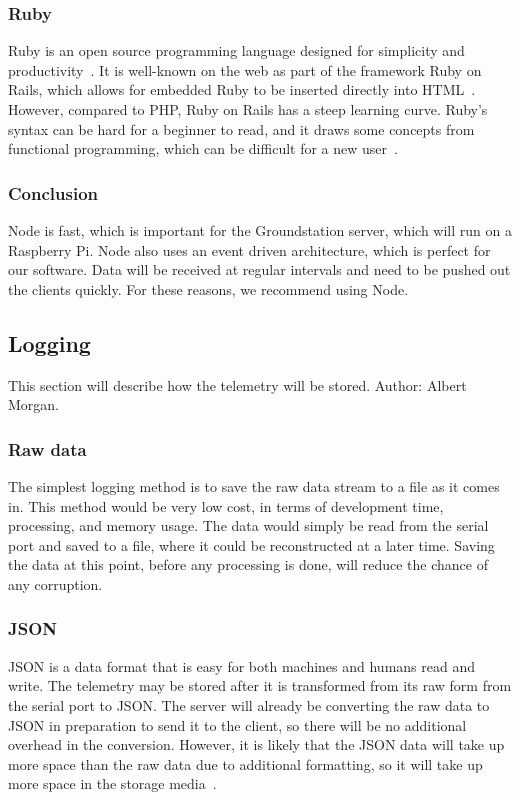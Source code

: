 \documentclass[10pt,draftclsnofoot,onecolumn]{IEEEtran}
\begin{document}
	\subsubsection{Ruby}
	Ruby is an open source programming language designed for simplicity and productivity~\cite{ruby}.
	It is well-known on the web as part of the framework Ruby on Rails, which allows for embedded Ruby to be inserted directly into HTML~\cite{getting-started-with-rails}.
	However, compared to PHP, Ruby on Rails has a steep learning curve.
	Ruby's syntax can be hard for a beginner to read, and it draws some concepts from functional programming, which can be difficult for a new user~\cite{ruby-on-rails-vs-php-the-good-the-bad}.	

	\subsubsection{Conclusion}
	Node is fast, which is important for the Groundstation server, which will run on a Raspberry Pi.
	Node also uses an event driven architecture, which is perfect for our software. Data will be received at regular intervals and need to be pushed out the clients quickly. For these reasons, we recommend using Node.


	\subsection{Logging}
	This section will describe how the telemetry will be stored. Author: Albert Morgan.
	\subsubsection{Raw data}
	The simplest logging method is to save the raw data stream to a file as it comes in.
	This method would be very low cost, in terms of development time, processing, and memory usage.
	The data would simply be read from the serial port and saved to a file, where it could be reconstructed at a later time.
	Saving the data at this point, before any processing is done, will reduce the chance of any corruption.
	
	\subsubsection{JSON}
	\ac{JSON} is a data format that is easy for both machines and humans read and write.
	The telemetry may be stored after it is transformed from its raw form from the serial port to \ac{JSON}.
	The server will already be converting the raw data to \ac{JSON} in preparation to send it to the client, so there will be no additional overhead in the conversion.
	However, it is likely that the \ac{JSON} data will take up more space than the raw data due to additional formatting, so it will take up more space in the storage media~\cite{json}.
	
\end{document}
